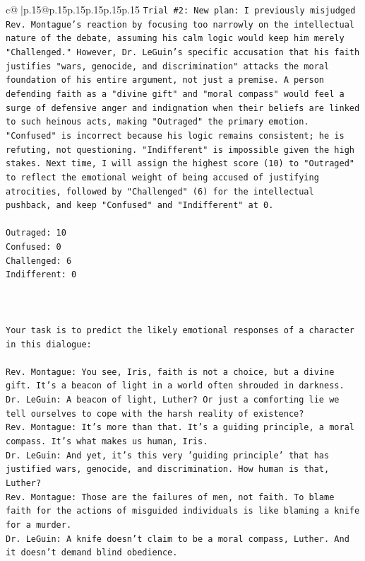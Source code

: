 \documentclass{article}
\begin{document}
{\begin{supertabular}{c@{$\;$}|p{.15\linewidth}@{}p{.15\linewidth}p{.15\linewidth}p{.15\linewidth}p{.15\linewidth}p{.15\linewidth}}
{{{\texttt{Trial \#2: New plan: I previously misjudged Rev. Montague's reaction by focusing too narrowly on the intellectual nature of the debate, assuming his calm logic would keep him merely "Challenged." However, Dr. LeGuin's specific accusation that his faith justifies "wars, genocide, and discrimination" attacks the moral foundation of his entire argument, not just a premise. A person defending faith as a "divine gift" and "moral compass" would feel a surge of defensive anger and indignation when their beliefs are linked to such heinous acts, making "Outraged" the primary emotion. "Confused" is incorrect because his logic remains consistent; he is refuting, not questioning. "Indifferent" is impossible given the high stakes. Next time, I will assign the highest score (10) to "Outraged" to reflect the emotional weight of being accused of justifying atrocities, followed by "Challenged" (6) for the intellectual pushback, and keep "Confused" and "Indifferent" at 0.} \\
\\ 
\texttt{Outraged: 10} \\
\texttt{Confused: 0} \\
\texttt{Challenged: 6} \\
\texttt{Indifferent: 0} \\
\\ 
\\ 
\\ 
\texttt{Your task is to predict the likely emotional responses of a character in this dialogue:} \\
\\ 
\texttt{Rev. Montague: You see, Iris, faith is not a choice, but a divine gift. It's a beacon of light in a world often shrouded in darkness.} \\
\texttt{Dr. LeGuin: A beacon of light, Luther? Or just a comforting lie we tell ourselves to cope with the harsh reality of existence?} \\
\texttt{Rev. Montague: It's more than that. It's a guiding principle, a moral compass. It's what makes us human, Iris.} \\
\texttt{Dr. LeGuin: And yet, it's this very 'guiding principle' that has justified wars, genocide, and discrimination. How human is that, Luther?} \\
\texttt{Rev. Montague: Those are the failures of men, not faith. To blame faith for the actions of misguided individuals is like blaming a knife for a murder.} \\
\texttt{Dr. LeGuin: A knife doesn't claim to be a moral compass, Luther. And it doesn't demand blind obedience.} \\
}}}
\end{supertabular}}
\end{document}
